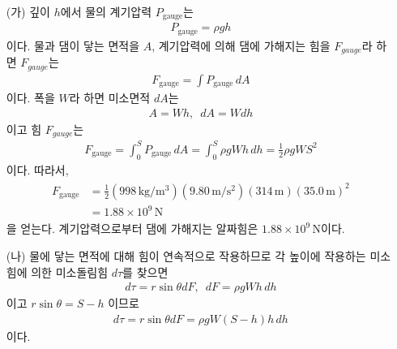 \documentclass[floatfix,nofootinbib,superscriptaddress,fleqn]{revtex4-2}
\begin{document}
\begin{itemize}
  \item[(가)]
  깊이 $h$에서 물의 계기압력 $P_{\mathrm{gauge}}$는
  \begin{align}
    P_{\mathrm{gauge}} = \rho g h
  \end{align}
  이다.
  물과 댐이 닿는 면적을 $A$, 계기압력에 의해 댐에 가해지는 힘을 
  $F_{gauge}$라 하면 $F_{gauge}$는
  \begin{align}
    F_{\mathrm{gauge}} = \int P_{\mathrm{gauge}}\,dA
  \end{align}
  이다. 폭을 $W$라 하면 미소면적 $dA$는
  \begin{align}
    A = Wh,\,\,\, dA = Wdh
  \end{align}
  이고 힘 $F_{gauge}$는
  \begin{align}\label{eq:2-1}
    F_{\mathrm{gauge}} = \int^S_0 P_{\mathrm{gauge}}\,dA
    =\int^S_0 \rho g W h\,dh = \frac{1}{2}\rho g WS^2
  \end{align}
  이다. 따라서,
  \begin{align}
    \begin{split}
      F_{\mathrm{gauge}} &= \frac{1}{2}(998\,\mathrm{kg/m^3})
      (9.80\,\mathrm{m/s^2}) 
      (314\,\mathrm{m})(35.0\,\mathrm{m})^2  \\
      &= 1.88\times 10^9\,\mathrm{N}
    \end{split}
  \end{align}
  을 얻는다. 계기압력으로부터 댐에 가해지는 알짜힘은 
  $ 1.88\times 10^9\,\mathrm{N}$이다.
  \item[(나)] 
  물에 닿는 면적에 대해 힘이 연속적으로 작용하므로 
  각 높이에 작용하는 미소힘에 의한 미소돌림힘 $d\tau$를 찾으면
  \begin{align}
    d\tau = r\sin\theta dF,\,\,\,dF=\rho g Wh\,dh
  \end{align}
  이고 $r\sin\theta=S-h$ 이므로 
  \begin{align}
    d\tau = r\sin\theta dF
    =\rho g W (S-h)h \,dh
  \end{align}
  이다. 
  \begin{figure}[htbp]
  \end{figure}


\end{itemize}
\end{document}
